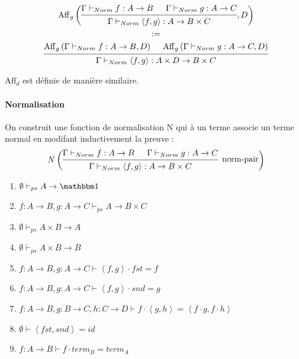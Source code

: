 \documentclass[conference]{IEEEtran}
\begin{document}
\begin{align}
\begin{gathered}
	\mathrm{Aff}_g \left(
	\begin{prooftree}
		\hypo[]{\Gamma \vdash_{Norm} f : A \rightarrow B}
		\hypo[]{\Gamma \vdash_{Norm} g : A \rightarrow C}
		\infer2[]{\Gamma \vdash_{Norm} \left<f, g\right> : A \rightarrow B \times C}
	\end{prooftree}
	, D
	\right) \\
	:= \\
	\begin{prooftree}
		\hypo[]{\mathrm{Aff}_g \left( \Gamma \vdash_{Norm} f : A \rightarrow B , D \right)}
		\hypo[]{\mathrm{Aff}_g \left( \Gamma \vdash_{Norm} g : A \rightarrow C , D \right)}
		\infer2[]{\Gamma \vdash_{Norm} \left<f, g\right> : A \times D \rightarrow B \times C}
	\end{prooftree}
\end{gathered}
\end{align}

$\mathrm{Aff}_d$ est définie de manière similaire.

\paragraph{Normalisation} On construit une fonction de normalisation N qui à un terme associe un terme normal en modifant inductivement la preuve : 
\begin{align}
	N\left( 
	\begin{prooftree}
		\hypo[]{\Gamma \vdash_{Norm} f : A \rightarrow B}
		\hypo[]{\Gamma \vdash_{Norm} g : A \rightarrow C}
		\infer2[norm-pair]{\Gamma \vdash_{Norm} \left<f, g\right> : A \rightarrow B \times C}
	\end{prooftree}
	\right)
\end{align}

\begin{enumerate}
	\item $\emptyset \vdash_{ps} A \rightarrow \mathbbm 1$
	\item $f : A \rightarrow B, g : A \rightarrow C \vdash_{ps} A \rightarrow B \times C$
	\item $\emptyset \vdash_{ps} A \times B \rightarrow A$
	\item $\emptyset \vdash_{ps} A \times B \rightarrow B$
	
	\item $f : A \rightarrow B, g : A \rightarrow C \vdash \left<f, g\right> \cdot fst = f$
	\item $f : A \rightarrow B, g : A \rightarrow C \vdash \left<f, g\right> \cdot snd = g$
	\item $f : A \rightarrow B, g : B \rightarrow C, h : C \rightarrow D \vdash f \cdot \left<g, h\right> = \left< f \cdot g, f \cdot h\right>$
	\item $\emptyset \vdash \left<fst, snd\right> = id$
	\item $f : A \rightarrow B \vdash f \cdot term_B = term_A$
\end{enumerate}
\end{document}
